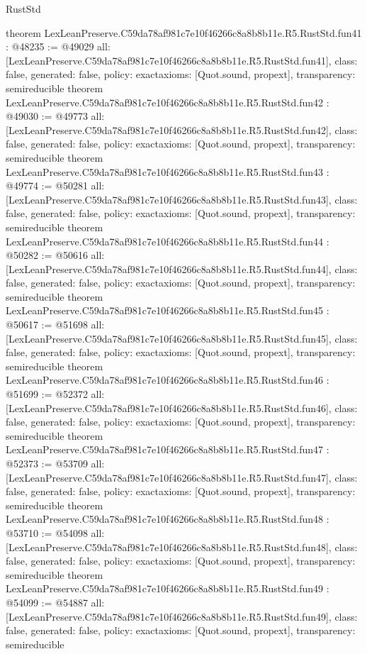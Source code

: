 \begin{lexlean}{RustStd}
\begin{coremodule}
{}
theorem LexLeanPreserve.C59da78af981c7e10f46266c8a8b8b11e.R5.RustStd.fun41 : @48235 := @49029 {
  all: [LexLeanPreserve.C59da78af981c7e10f46266c8a8b8b11e.R5.RustStd.fun41],
  class: false,
  generated: false,
  policy: exact{axioms: [Quot.sound, propext]},
  transparency: semireducible
}
theorem LexLeanPreserve.C59da78af981c7e10f46266c8a8b8b11e.R5.RustStd.fun42 : @49030 := @49773 {
  all: [LexLeanPreserve.C59da78af981c7e10f46266c8a8b8b11e.R5.RustStd.fun42],
  class: false,
  generated: false,
  policy: exact{axioms: [Quot.sound, propext]},
  transparency: semireducible
}
theorem LexLeanPreserve.C59da78af981c7e10f46266c8a8b8b11e.R5.RustStd.fun43 : @49774 := @50281 {
  all: [LexLeanPreserve.C59da78af981c7e10f46266c8a8b8b11e.R5.RustStd.fun43],
  class: false,
  generated: false,
  policy: exact{axioms: [Quot.sound, propext]},
  transparency: semireducible
}
theorem LexLeanPreserve.C59da78af981c7e10f46266c8a8b8b11e.R5.RustStd.fun44 : @50282 := @50616 {
  all: [LexLeanPreserve.C59da78af981c7e10f46266c8a8b8b11e.R5.RustStd.fun44],
  class: false,
  generated: false,
  policy: exact{axioms: [Quot.sound, propext]},
  transparency: semireducible
}
theorem LexLeanPreserve.C59da78af981c7e10f46266c8a8b8b11e.R5.RustStd.fun45 : @50617 := @51698 {
  all: [LexLeanPreserve.C59da78af981c7e10f46266c8a8b8b11e.R5.RustStd.fun45],
  class: false,
  generated: false,
  policy: exact{axioms: [Quot.sound, propext]},
  transparency: semireducible
}
theorem LexLeanPreserve.C59da78af981c7e10f46266c8a8b8b11e.R5.RustStd.fun46 : @51699 := @52372 {
  all: [LexLeanPreserve.C59da78af981c7e10f46266c8a8b8b11e.R5.RustStd.fun46],
  class: false,
  generated: false,
  policy: exact{axioms: [Quot.sound, propext]},
  transparency: semireducible
}
theorem LexLeanPreserve.C59da78af981c7e10f46266c8a8b8b11e.R5.RustStd.fun47 : @52373 := @53709 {
  all: [LexLeanPreserve.C59da78af981c7e10f46266c8a8b8b11e.R5.RustStd.fun47],
  class: false,
  generated: false,
  policy: exact{axioms: [Quot.sound, propext]},
  transparency: semireducible
}
theorem LexLeanPreserve.C59da78af981c7e10f46266c8a8b8b11e.R5.RustStd.fun48 : @53710 := @54098 {
  all: [LexLeanPreserve.C59da78af981c7e10f46266c8a8b8b11e.R5.RustStd.fun48],
  class: false,
  generated: false,
  policy: exact{axioms: [Quot.sound, propext]},
  transparency: semireducible
}
theorem LexLeanPreserve.C59da78af981c7e10f46266c8a8b8b11e.R5.RustStd.fun49 : @54099 := @54887 {
  all: [LexLeanPreserve.C59da78af981c7e10f46266c8a8b8b11e.R5.RustStd.fun49],
  class: false,
  generated: false,
  policy: exact{axioms: [Quot.sound, propext]},
  transparency: semireducible
}
\end{coremodule}
\end{lexlean}
